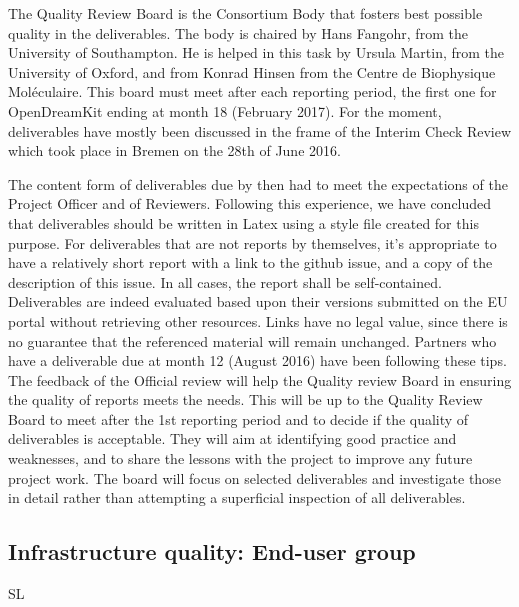 \documentclass{deliverablereport}
\begin{document}
The Quality Review Board is the Consortium Body that fosters best
possible quality in the deliverables.  The body is chaired by Hans
Fangohr, from the University of Southampton. He is helped in this
task by Ursula Martin, from the University of Oxford, and from Konrad
Hinsen from the Centre de Biophysique Moléculaire. This board must
meet after each reporting period, the first one for OpenDreamKit
ending at month 18 (February 2017).  For the moment, deliverables
have mostly been discussed in the frame of the Interim Check Review
which took place in Bremen on the 28th of June 2016.


The content form of deliverables due by then had to meet the
expectations of the Project Officer and of Reviewers. Following this
experience, we have concluded that deliverables should be written in
Latex using a style file created for this purpose. For deliverables
that are not reports by themselves, it's appropriate to have a
relatively short report with a link to the github issue, and a copy of
the description of this issue. In all cases, the report shall be
self-contained. Deliverables are indeed evaluated based upon their
versions submitted on the EU portal without retrieving other
resources. Links have no legal value, since there is no guarantee that
the referenced material will remain unchanged.  Partners who have a
deliverable due at month 12 (August 2016) have been following these
tips. The feedback of the Official review will help the Quality review
Board in ensuring the quality of reports meets the needs. This will be
up to the Quality Review Board to meet after the 1st reporting period
and to decide if the quality of deliverables is acceptable.  They will
aim at identifying good practice and weaknesses, and to share the
lessons with the project to improve any future project work. The board
will focus on selected deliverables and investigate those in detail
rather than attempting a superficial inspection of all deliverables.


\subsection{Infrastructure quality: End-user group}

SL
\end{document}
